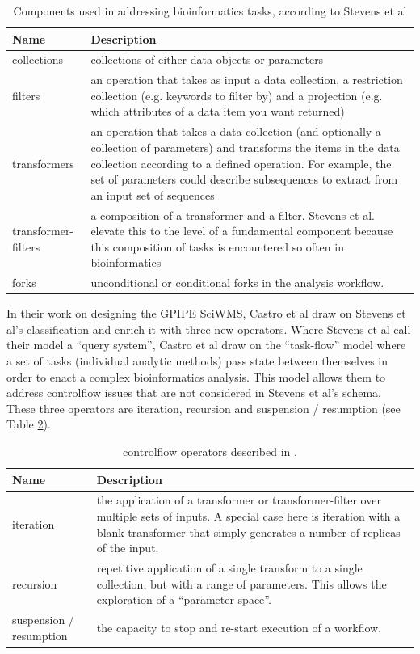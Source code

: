 \documentclass[a4paper,10pt]{scrreprt} \usepackage[utf8]{inputenc}
\begin{document}
\begin{table}[h]
\begin{tabular}{|l|p{7cm}|}
\hline \textbf{Name} & \textbf{Description} \\
\hline collections & collections of either data objects or parameters \\
\hline filters & an operation that takes as input a data collection, a restriction collection (e.g. keywords to filter by) and a projection (e.g. which attributes of a data item you want returned) \\
\hline transformers & an operation that takes a data collection (and optionally a collection of parameters) and transforms the items in the data collection according to a defined operation. For example, the set of parameters could describe subsequences to extract from an input set of sequences \\
\hline transformer-filters & a composition of a transformer and a filter. Stevens et al. elevate this to the level of a fundamental component because this composition of tasks is encountered so often in bioinformatics \\
\hline forks & unconditional or conditional forks in the analysis workflow. \\
\hline
\end{tabular} 
\caption{Components used in addressing bioinformatics tasks, according to Stevens et al \protect\cite{stevens_classification_2001}}
\label{tab:stevenscomponents} 
\end{table}

In their work on designing the GPIPE \gls{SciWMS}, Castro et al \cite{castro_workflows_2005} draw on
Stevens et al's classification and enrich it with three new operators. Where Stevens et al call their 
model a ``query system'', Castro et al draw on the ``task-flow'' model where a set of tasks 
(individual analytic methods) pass state between themselves in order to enact a complex 
bioinformatics analysis. This model allows them to address \gls{controlflow} issues that are not
considered in Stevens et al's schema. These three operators are iteration, recursion and 
suspension / resumption (see Table \ref{tab:castrocomponents}).

\begin{table}[h]
\begin{tabular}{|l|p{7cm}|}
\hline \textbf{Name} & \textbf{Description} \\
\hline iteration & the application of a transformer or transformer-filter over multiple sets of inputs. A special case here is iteration with a blank transformer that simply generates a number of replicas of the input. \\
\hline recursion & repetitive application of a single transform to a single collection, but with a range of parameters. This allows the exploration of a ``parameter space''. \\
\hline suspension / resumption & the capacity to stop and re-start execution of a workflow. \\
\hline
\end{tabular}
\caption{\protect\Gls{controlflow} operators described in \cite{castro_workflows_2005}. }
\label{tab:castrocomponents} 
\end{table}
\end{document}
